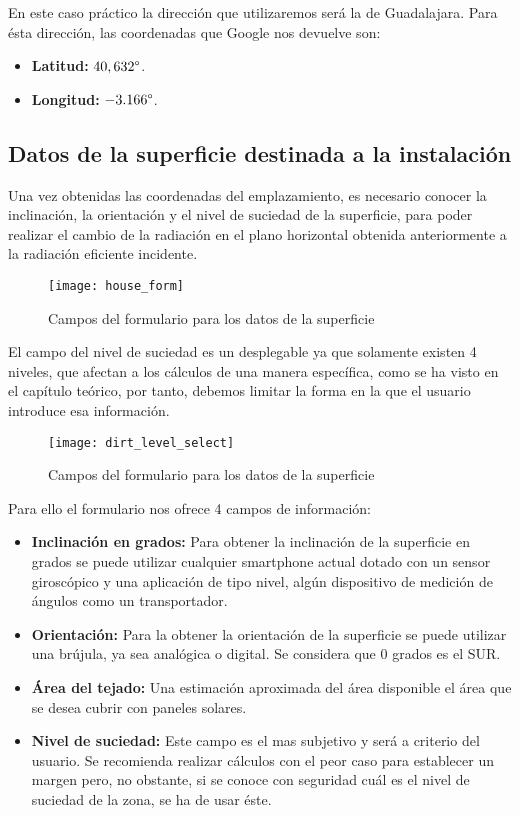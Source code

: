 En este caso práctico la dirección que utilizaremos será la de Guadalajara. Para ésta dirección, las coordenadas que Google nos devuelve son:
\begin{itemize}
\item \textbf{Latitud:} $40,632 \degree$.
\item \textbf{Longitud:} $-3.166 \degree$.
\end{itemize}

\subsection{Datos de la superficie destinada a la instalación}

Una vez obtenidas las coordenadas del emplazamiento, es necesario conocer la inclinación, la orientación y el nivel de suciedad de la superficie, para poder realizar el cambio de la radiación en el plano horizontal obtenida anteriormente a la radiación eficiente incidente.

\begin{figure}[ht]
\texttt{[image: house\_form]}
\centering
\caption{Campos del formulario para los datos de la superficie}
\label{fig:house_form}
\end{figure}

\newpage

El campo del nivel de suciedad es un desplegable ya que solamente existen 4 niveles, que afectan a los cálculos de una manera específica, como se ha visto en el capítulo teórico, por tanto, debemos limitar la forma en la que el usuario introduce esa información.

\begin{figure}[ht]
\texttt{[image: dirt\_level\_select]}
\centering
\caption{Campos del formulario para los datos de la superficie}
\label{fig:dirt_level_input}
\end{figure}


Para ello el formulario nos ofrece 4 campos de información:

\begin{itemize}
\item \textbf{Inclinación en grados:} Para obtener la inclinación de la superficie en grados se puede utilizar cualquier smartphone actual dotado con un sensor giroscópico y una aplicación de tipo nivel, algún dispositivo de medición de ángulos como un transportador.
\item \textbf{Orientación:} Para la obtener la orientación de la superficie se puede utilizar una brújula, ya sea analógica o digital. Se considera que 0 grados es el SUR.
\item \textbf{Área del tejado:} Una estimación aproximada del área disponible el área que se desea cubrir con paneles solares.
\item \textbf{Nivel de suciedad:} Este campo es el mas subjetivo y será a criterio del usuario. Se recomienda realizar cálculos con el peor caso para establecer un margen pero, no obstante, si se conoce con seguridad cuál es el nivel de suciedad de la zona, se ha de usar éste.
\end{itemize}

